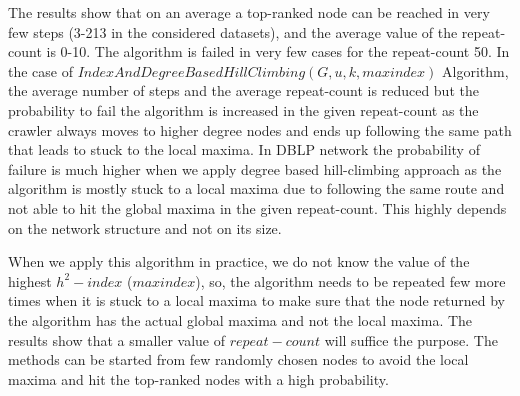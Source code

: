 \documentclass[12pt,3p]{article}
\begin{document}
The results show that on an average a top-ranked node can be reached in very few steps (3-213 in the considered datasets), and the average value of the repeat-count is 0-10. The algorithm is failed in very few cases for the repeat-count 50. In the case of $IndexAndDegreeBasedHillClimbing(G,u,k,maxindex)$ Algorithm, the average number of steps and the average repeat-count is reduced but the probability to fail the algorithm is increased in the given repeat-count as the crawler always moves to higher degree nodes and ends up following the same path that leads to stuck to the local maxima. In DBLP network the probability of failure is much higher when we apply degree based hill-climbing approach as the algorithm is mostly stuck to a local maxima due to following the same route and not able to hit the global maxima in the given repeat-count. This highly depends on the network structure and not on its size. %

When we apply this algorithm in practice, we do not know the value of the highest $h^2-index$ ($maxindex$), so, the algorithm needs to be repeated few more times when it is stuck to a local maxima to make sure that the node returned by the algorithm has the actual global maxima and not the local maxima. The results show that a smaller value of $repeat-count$ will suffice the purpose. The methods can be started from few randomly chosen nodes to avoid the local maxima and hit the top-ranked nodes with a high probability.


\end{document}
